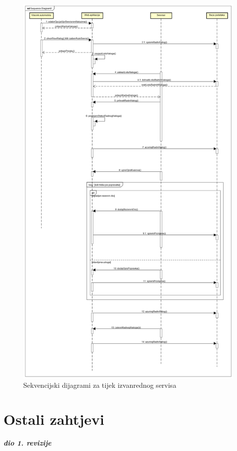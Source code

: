 	\begin{figure}
		\centering
		\includegraphics[width=0.8\linewidth]{dijagrami/seq-dia-service2}
		\caption{Sekvencijski dijagrami za tijek izvanrednog servisa}
		\label{fig:seq-dia-service2}
	\end{figure}



   	
\eject

\section{Ostali zahtjevi}

\textbf{\textit{dio 1. revizije}}\\

